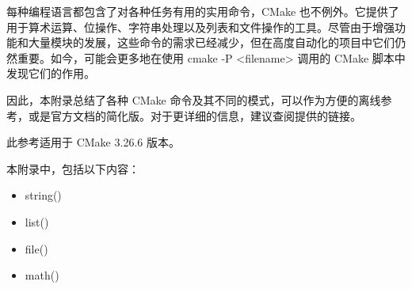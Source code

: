 
每种编程语言都包含了对各种任务有用的实用命令，CMake 也不例外。它提供了用于算术运算、位操作、字符串处理以及列表和文件操作的工具。尽管由于增强功能和大量模块的发展，这些命令的需求已经减少，但在高度自动化的项目中它们仍然重要。如今，可能会更多地在使用 cmake -P <filename> 调用的 CMake 脚本中发现它们的作用。

因此，本附录总结了各种 CMake 命令及其不同的模式，可以作为方便的离线参考，或是官方文档的简化版。对于更详细的信息，建议查阅提供的链接。

此参考适用于 CMake 3.26.6 版本。

本附录中，包括以下内容：

\begin{itemize}
\item
string()

\item
list()

\item
file()

\item
math()
\end{itemize}




















